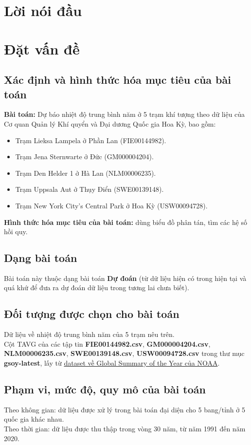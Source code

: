 \documentclass[a4paper]{article}
\begin{document}
\section*{Lời nói đầu}

\newpage

\section{Đặt vấn đề}
\subsection{Xác định và hình thức hóa mục tiêu của bài toán}
\textbf{Bài toán:} Dự báo nhiệt độ trung bình năm ở 5 trạm khí tượng theo dữ liệu của Cơ quan Quản lý Khí quyển và Đại dương Quốc gia Hoa Kỳ, bao gồm:
\begin{itemize}
\item Trạm Lieksa Lampela ở Phần Lan (FIE00144982).
\item Trạm Jena Sternwarte ở Đức (GM000004204).
\item Trạm Den Helder 1 ở Hà Lan (NLM00006235).
\item Trạm Uppsala Aut ở Thụy Điển (SWE00139148).
\item Trạm New York City's Central Park ở Hoa Kỳ (USW00094728).
\end{itemize}
\textbf{Hình thức hóa mục tiêu của bài toán:} dùng biểu đồ phân tán, tìm các hệ số hồi quy.

\subsection{Dạng bài toán}
Bài toán này thuộc dạng bài toán \textbf{Dự đoán} (từ dữ liệu hiện có trong hiện tại và quá khứ để đưa ra dự đoán dữ liệu trong tương lai chưa biết).

\subsection{Đối tượng được chọn cho bài toán}
Dữ liệu về nhiệt độ trung bình năm của 5 trạm nêu trên.\\
Cột TAVG của các  tập tin \textbf{FIE00144982.csv}, \textbf{GM000004204.csv}, \textbf{NLM00006235.csv}, \textbf{SWE00139148.csv}, \textbf{USW00094728.csv}  trong thư mục \textbf{gsoy-latest}, lấy từ \href{https://www.ncei.noaa.gov/data/gsoy/archive/}{dataset về Global Summary of the Year của NOAA}.

\subsection{Phạm vi, mức độ, quy mô của bài toán}
Theo không gian: dữ liệu được xử lý trong bài toán đại diện cho 5 bang/tỉnh ở 5 quốc gia khác nhau.\\
Theo thời gian: dữ liệu được thu thập trong vòng 30 năm, từ năm 1991 đến năm 2020.
\end{document}
